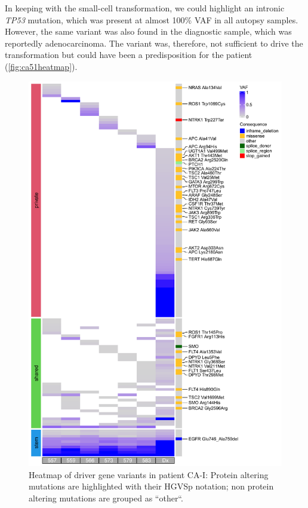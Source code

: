 In keeping with the small-cell transformation, we could highlight an intronic \textit{TP53} mutation, which was present at almost 100\% VAF in all autopsy samples. However, the same variant was also found in the diagnostic sample, which was reportedly adenocarcinoma. The variant was, therefore, not sufficient to drive the transformation but could have been a predisposition for the patient (\autoref{fig:ca51heatmap}).


\begin{figure}[htp]
\centering
\includegraphics[width=.99\linewidth]{Figures/CASCADE/CA51/CA51varHeatmap.pdf}
\caption[Heatmap of driver gene variants in patient CA-I]{Heatmap of driver gene variants in patient CA-I: Protein altering mutations are highlighted with their HGVSp notation; non protein altering mutations are grouped as ``other``.} \label{fig:ca51heatmap}
\end{figure}



